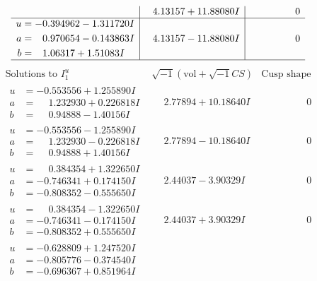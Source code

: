 \documentclass[1p]{elsarticle_modified}
\theoremstyle{definition}
\newcommand{\I}{\sqrt{-1}}
\begin{document}
$$\begin{array}{c|c|c}
 & \phantom{-}4.13157 + 11.88080 I & \phantom{-0.000000 } 0 \\ \hline\begin{aligned}
u &= -0.394962 - 1.311720 I \\
a &= \phantom{-}0.970654 - 0.143863 I \\
b &= \phantom{-}1.06317 + 1.51083 I\end{aligned}
 & \phantom{-}4.13157 - 11.88080 I & \phantom{-0.000000 } 0\\
 \hline 
 \end{array}$$\newpage$$\begin{array}{c|c|c}  
\text{Solutions to }I^u_{1}& \I (\text{vol} + \sqrt{-1}CS) & \text{Cusp shape}\\
 \hline 
\begin{aligned}
u &= -0.553556 + 1.255890 I \\
a &= \phantom{-}1.232930 + 0.226818 I \\
b &= \phantom{-}0.94888 - 1.40156 I\end{aligned}
 & \phantom{-}2.77894 + 10.18640 I & \phantom{-0.000000 } 0 \\ \hline\begin{aligned}
u &= -0.553556 - 1.255890 I \\
a &= \phantom{-}1.232930 - 0.226818 I \\
b &= \phantom{-}0.94888 + 1.40156 I\end{aligned}
 & \phantom{-}2.77894 - 10.18640 I & \phantom{-0.000000 } 0 \\ \hline\begin{aligned}
u &= \phantom{-}0.384354 + 1.322650 I \\
a &= -0.746341 + 0.174150 I \\
b &= -0.808352 - 0.555650 I\end{aligned}
 & \phantom{-}2.44037 - 3.90329 I & \phantom{-0.000000 } 0 \\ \hline\begin{aligned}
u &= \phantom{-}0.384354 - 1.322650 I \\
a &= -0.746341 - 0.174150 I \\
b &= -0.808352 + 0.555650 I\end{aligned}
 & \phantom{-}2.44037 + 3.90329 I & \phantom{-0.000000 } 0 \\ \hline\begin{aligned}
u &= -0.628809 + 1.247520 I \\
a &= -0.805776 - 0.374540 I \\
b &= -0.696367 + 0.851964 I\end{aligned}

\end{array}$$
\end{document}
